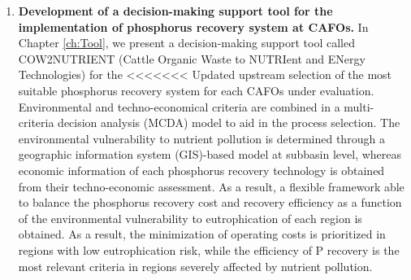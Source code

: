 \begin{enumerate}[font=\bfseries]
	\item \textbf{Development of a decision-making support tool for the implementation of phosphorus recovery system at CAFOs.} In Chapter \ref{ch:Tool}, we present a decision-making support tool called  COW2NUTRIENT (Cattle Organic Waste to NUTRIent and ENergy Technologies) for the
<<<<<<< Updated upstream
	selection of the most suitable phosphorus recovery system for each CAFOs under evaluation. Environmental and techno-economical criteria are combined in a multi-criteria decision analysis (MCDA) model to aid in the process selection. The environmental vulnerability to nutrient pollution is determined through a geographic information system (GIS)-based model at subbasin level, whereas economic information of each phosphorus recovery technology is obtained from their techno-economic assessment. As a result, a flexible framework able to balance the phosphorus recovery cost and recovery efficiency as a function of the environmental vulnerability to eutrophication of each region is obtained. As a result, the minimization of operating costs is
	prioritized in regions with low eutrophication risk, while the efficiency of P recovery is the most relevant criteria in regions severely affected by nutrient pollution.
	

\end{enumerate}
